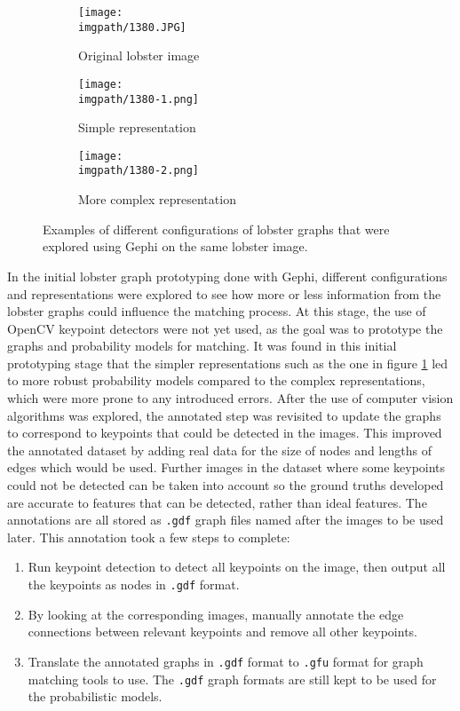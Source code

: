 \begin{figure}[H]
\centering
	\begin{subfigure}{0.31\textwidth}
		\texttt{[image: \\imgpath/1380.JPG]}
		\caption{Original lobster image}
	\end{subfigure}
	\hspace*{\fill}
	\begin{subfigure}{0.31\textwidth}
		\texttt{[image: \\imgpath/1380-1.png]}
		\caption{Simple representation}
                \label{fig:gephi-simple}
	\end{subfigure}
	\hspace*{\fill}
	\begin{subfigure}{0.31\textwidth}
		\texttt{[image: \\imgpath/1380-2.png]}
		\caption{More complex representation}
                \label{fig:gephi-complex}
	\end{subfigure}
\caption{Examples of different configurations of lobster graphs that were explored using Gephi on the same lobster image.}
\end{figure}
\noindent
In the initial lobster graph prototyping done with Gephi, different configurations and representations were explored to see how more or less information from the lobster graphs could influence the matching process. At this stage, the use of OpenCV keypoint detectors were not yet used, as the goal was to prototype the graphs and probability models for matching. It was found in this initial prototyping stage that the simpler representations such as the one in figure \ref{fig:gephi-simple} led to more robust probability models compared to the complex representations, which were more prone to any introduced errors.
\n
After the use of computer vision algorithms was explored, the annotated step was revisited to update the graphs to correspond to keypoints that could be detected in the images. This improved the annotated dataset by adding real data for the size of nodes and lengths of edges which would be used. Further images in the dataset where some keypoints could not be detected can be taken into account so the ground truths developed are accurate to features that can be detected, rather than ideal features. The annotations are all stored as \texttt{.gdf} graph files named after the images to be used later. This annotation took a few steps to complete:
\begin{enumerate}
\item Run keypoint detection to detect all keypoints on the image, then output all the keypoints as nodes in \texttt{.gdf} format.
\item By looking at the corresponding images, manually annotate the edge connections between relevant keypoints and remove all other keypoints.
\item Translate the annotated graphs in \texttt{.gdf} format to \texttt{.gfu} format for graph matching tools to use. The \texttt{.gdf} graph formats are still kept to be used for the probabilistic models.
\end{enumerate}


